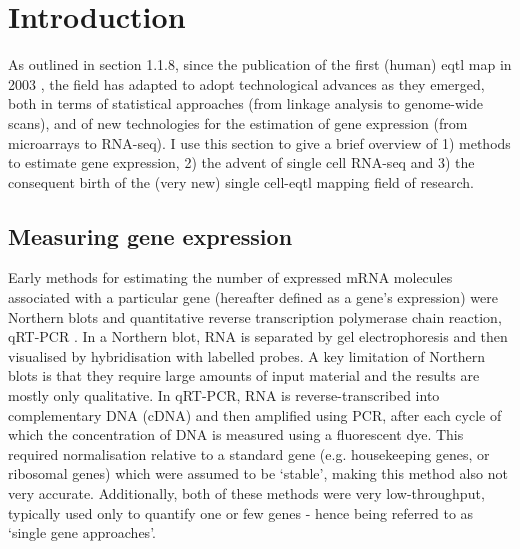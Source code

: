 \newpage

\section{Introduction}

As outlined in section 
1.1.8,
since the publication of the first (human) \gls{eqtl} map in 2003 \cite{schadt2003genetics}, the field has adapted to adopt technological advances as they emerged, both in terms of statistical approaches (from linkage analysis to genome-wide scans), and of new technologies for the estimation of gene expression (from microarrays to RNA-seq).
I use this section to give a brief overview of 1) methods to estimate gene expression, 2) the advent of single cell RNA-seq and 3) the consequent birth of the (very new) single cell-\gls{eqtl} mapping field of research. 

\subsection{Measuring gene expression}

Early methods for estimating the number of expressed mRNA molecules associated with a particular gene (hereafter defined as a gene's expression)
were Northern blots \cite{alwine1977method} and quantitative reverse transcription polymerase chain reaction, qRT-PCR \cite{gibson1996novel}. 
In a Northern blot, RNA is separated by gel electrophoresis and then visualised by hybridisation with labelled probes. 
A key limitation of Northern blots is that they require large amounts of input material and the results are mostly only qualitative.
In qRT-PCR, RNA is reverse-transcribed into complementary DNA (cDNA) and then amplified using PCR, after each cycle of which the concentration of DNA is measured using a fluorescent dye. 
This required normalisation relative to a standard gene (e.g. 
housekeeping genes, or 
ribosomal genes) which were assumed to be `stable', making this method also not very accurate.
Additionally, both of these methods were very low-throughput, typically used only to quantify one or few genes - hence being referred to as `single gene approaches'.
\\

